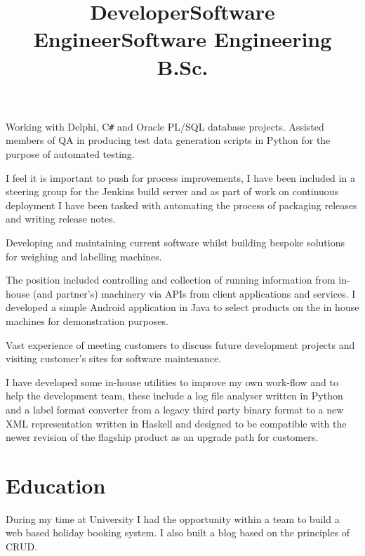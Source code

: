 \documentclass[line,margin]{res}
\newcommand{\CSharp}{C\texttt{\#}}
\begin{document}
\begin{resume}
\title{Developer}
\begin{position}
Working with Delphi, {\CSharp} and Oracle PL/SQL database projects.
Assisted members of QA in producing test data generation scripts in Python
for the purpose of automated testing.

I feel it is important to push for process improvements,
I have been included in a steering group for the Jenkins build server and
as part of work on continuous deployment
I have been tasked with automating the process of packaging releases and
writing release notes.
\end{position}

\title{Software Engineer}
\begin{position}
Developing and maintaining current software whilst building bespoke solutions
for weighing and labelling machines.

The position included controlling and collection of running information from
in-house (and partner's) machinery via APIs from
client applications and services.
I developed a simple Android application in Java to select products on the
in house machines for demonstration purposes.

Vast experience of meeting customers to discuss future development projects and
visiting customer's sites for software maintenance.

I have developed some in-house utilities to improve my own work-flow and
to help the development team,
these include a log file analyser written in Python and
a label format converter from a legacy third party binary format to
a new XML representation written in Haskell and
designed to be compatible with the newer revision of the flagship product
as an upgrade path for customers.
\end{position}

\section{Education}

\title{Software Engineering B.Sc.} %
\begin{position}
During my time at University I had the opportunity within a team to build
a web based holiday booking system.
I also built a blog based on the principles of CRUD.


\end{position}
\end{resume}
\end{document}
